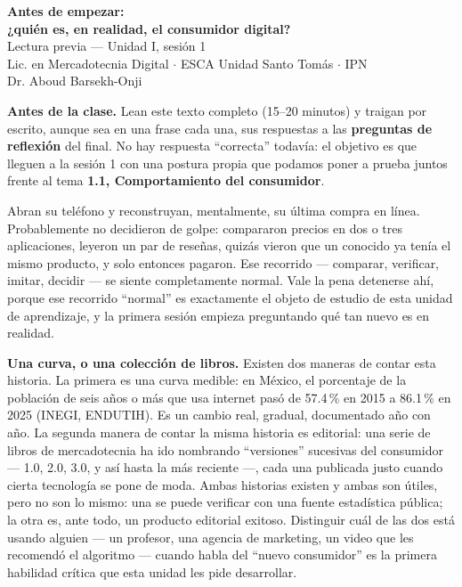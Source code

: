 \documentclass[12pt,letterpaper]{article}
\begin{document}
\thispagestyle{fancy}

\begin{center}
  {\LARGE \textbf{Antes de empezar: \\[2pt] ¿quién es, en realidad, el consumidor digital?}}\\[6pt]
  {\large Lectura previa --- Unidad I, sesión 1}\\[4pt]
  {\small Lic. en Mercadotecnia Digital $\cdot$ ESCA Unidad Santo Tomás $\cdot$ IPN}\\[4pt]
  {\small Dr. Aboud Barsekh-Onji}
\end{center}

\vspace{0.3cm}

\begin{cajaInstrucciones}
\textbf{Antes de la clase.} Lean este texto completo (15--20 minutos) y traigan
por escrito, aunque sea en una frase cada una, sus respuestas a las
\textbf{preguntas de reflexión} del final. No hay respuesta \enquote{correcta}
todavía: el objetivo es que lleguen a la sesión 1 con una postura propia que
podamos poner a prueba juntos frente al tema \textbf{1.1, Comportamiento del
consumidor}.
\end{cajaInstrucciones}

\vspace{0.2cm}

Abran su teléfono y reconstruyan, mentalmente, su última compra en línea.
Probablemente no decidieron de golpe: compararon precios en dos o tres
aplicaciones, leyeron un par de reseñas, quizás vieron que un conocido ya
tenía el mismo producto, y solo entonces pagaron. Ese recorrido --- comparar,
verificar, imitar, decidir --- se siente completamente normal. Vale la pena
detenerse ahí, porque ese recorrido \enquote{normal} es exactamente el objeto de
estudio de esta unidad de aprendizaje, y la primera sesión empieza preguntando
qué tan nuevo es en realidad.

\textbf{Una curva, o una colección de libros.} Existen dos maneras de contar
esta historia. La primera es una curva medible: en México, el porcentaje de
la población de seis años o más que usa internet pasó de 57.4\,\% en 2015 a
86.1\,\% en 2025 (INEGI, ENDUTIH). Es un cambio real, gradual, documentado
año con año. La segunda manera de contar la misma historia es editorial: una
serie de libros de mercadotecnia ha ido nombrando \enquote{versiones} sucesivas
del consumidor --- 1.0, 2.0, 3.0, y así hasta la más reciente ---, cada una
publicada justo cuando cierta tecnología se pone de moda. Ambas historias
existen y ambas son útiles, pero no son lo mismo: una se puede verificar con
una fuente estadística pública; la otra es, ante todo, un producto editorial
exitoso. Distinguir cuál de las dos está usando alguien --- un profesor, una
agencia de marketing, un video que les recomendó el algoritmo --- cuando habla
del \enquote{nuevo consumidor} es la primera habilidad crítica que esta unidad
les pide desarrollar.
\end{document}
